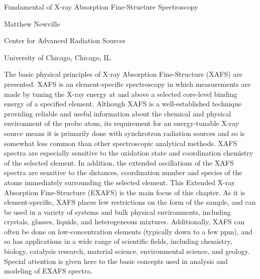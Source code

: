 \newcommand{\mytitle}{X-ray Absorption Fine-Structure Spectroscopy}
\newcommand{\myauthor}{Matthew Newville}

\begin{center}
  \Large{Fundamental of X-ray Absorption Fine-Structure Spectroscopy}
\end{center}
\vspace{5mm}

\begin{center} Matthew Newville \end{center}
\begin{center} Center for Advanced Radiation Sources\par
University of Chicago, Chicago, IL\par\end{center}

\vspace{5mm}

The basic physical principles of X-ray Absorption Fine-Structure (XAFS) are
presented.  XAFS is an element-specific spectroscopy in which measurements
are made by tuning the X-ray energy at and above a selected core-level
binding energy of a specified element.  Although XAFS is a well-established
technique providing reliable and useful information about the chemical and
physical environment of the probe atom, its requirement for an
energy-tunable X-ray source means it is primarily done with synchrotron
radiation sources and so is somewhat less common than other spectroscopic
analytical methods.  XAFS spectra are especially sensitive to the oxidation
state and coordination chemistry of the selected element.  In addition, the
extended oscillations of the XAFS spectra are sensitive to the distances,
coordination number and species of the atoms immediately surrounding the
selected element.  This Extended X-ray Absorption Fine-Structure (EXAFS) is
the main focus of this chapter.  As it is element-specific, XAFS places few
restrictions on the form of the sample, and can be used in a variety of
systems and bulk physical environments, including crystals, glasses,
liquids, and heterogeneous mixtures.  Additionally, XAFS can often be done
on low-concentration elements (typically down to a few ppm), and so has
applications in a wide range of scientific fields, including chemistry,
biology, catalysis research, material science, environmental science, and
geology.  Special attention is given here to the basic concepts used in
analysis and modeling of EXAFS spectra.



\thispagestyle{empty}
\clearpage

